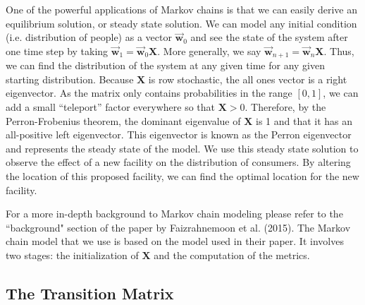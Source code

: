 \documentclass[twoside,twocolumn]{article}
\begin{document}
One of the powerful applications of Markov chains is that we can easily derive an equilibrium solution, or steady state solution. 
We can model any initial condition (i.e. distribution of people) as a vector $\vec{\textbf{w}}_0$ and see the state of the system after one time step by taking $\vec{\textbf{w}}_1 = \vec{\textbf{w}}_0 \textbf{X}$.
More generally, we say $\vec{\textbf{w}}_{n + 1} = \vec{\textbf{w}}_n \textbf{X}$.
Thus, we can find the distribution of the system at any given time for any given starting distribution.
Because $\textbf{X}$ is row stochastic, the all ones vector is a right eigenvector.
As the matrix only contains probabilities in the range $[0, 1]$, we can add a small ``teleport'' factor everywhere so that $\textbf{X} > 0$.
Therefore, by the Perron-Frobenius theorem, the dominant eigenvalue of $\textbf{X}$ is 1 and that it has an all-positive left eigenvector.
This eigenvector is known as the Perron eigenvector and represents the steady state of the model. %
We use this steady state solution to observe the effect of a new facility on the distribution of consumers.
By altering the location of this proposed facility, we can find the optimal location for the new facility.

For a more in-depth background to Markov chain modeling please refer to the ``background" section of the paper by Faizrahnemoon et al. (2015).
The Markov chain model that we use is based on the model used in their paper.
It involves two stages: the initialization of $\textbf{X}$ and the computation of the metrics.

\subsection{The Transition Matrix}
\label{sec:model_setup}
\end{document}
